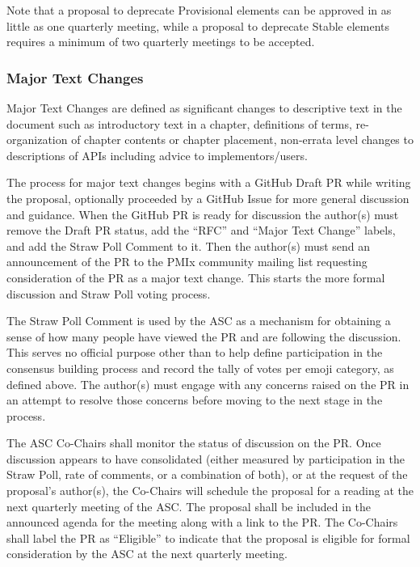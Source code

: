 \documentclass{article}
\begin{document}
Note that a proposal to deprecate Provisional elements can be
approved in as little as one quarterly meeting, while a proposal to
deprecate Stable elements requires a minimum of two quarterly
meetings to be accepted.

\hypertarget{major-text-changes}{%
\subsubsection{Major Text Changes}%
\label{major-text-changes}}

Major Text Changes are defined as significant changes to descriptive text in
the document such as introductory text in a chapter, definitions of terms,
re-organization of chapter contents or chapter placement, non-errata level
changes to descriptions of APIs including advice to implementors/users.

The process for major text changes begins with a GitHub Draft PR while writing the proposal, optionally proceeded by a GitHub Issue for more general discussion and guidance.
When the GitHub PR is ready for discussion the author(s) must remove the Draft PR status, add the ``RFC'' and ``Major Text Change'' labels, and add the Straw Poll Comment to it.
Then the author(s) must send an announcement of the PR to the PMIx community mailing list requesting consideration of the PR as a major text change.
This starts the more formal discussion and Straw Poll voting process.

The Straw Poll Comment is used by the ASC as a mechanism for
obtaining a sense of how many people have viewed the PR and are
following the discussion. This serves no official purpose other than to
help define participation in the consensus building process and record
the tally of votes per emoji category, as defined above.
The author(s) must engage with any concerns raised on the PR in an attempt to
resolve those concerns before moving to the next stage in the process.

The ASC Co-Chairs shall monitor the status of discussion on the PR. Once
discussion appears to have consolidated (either measured by
participation in the Straw Poll, rate of comments, or a combination of
both), or at the request of the proposal's author(s), the Co-Chairs will
schedule the proposal for a reading at the next quarterly meeting of the
ASC. The proposal shall be included in the announced agenda for the
meeting along with a link to the PR.
The Co-Chairs shall label the PR as ``Eligible'' to indicate that the proposal is
eligible for formal consideration by the ASC at the next quarterly meeting.
\end{document}
